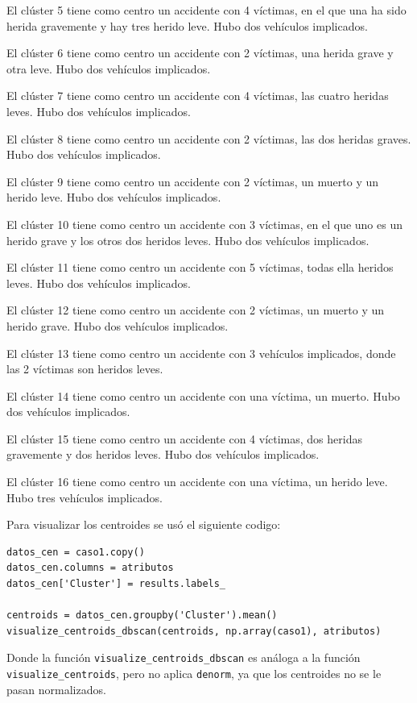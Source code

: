 \documentclass[a4]{article}
\begin{document}
El clúster 5 tiene como centro un accidente con 4 víctimas, en el que una ha sido herida gravemente y hay tres herido leve. Hubo dos vehículos implicados.

El clúster 6 tiene como centro un accidente con 2 víctimas, una herida grave  y otra leve. Hubo dos vehículos implicados.

El clúster 7 tiene como centro un accidente con 4 víctimas, las cuatro heridas leves. Hubo dos vehículos implicados.

El clúster 8 tiene como centro un accidente con 2 víctimas, las dos heridas graves. Hubo dos vehículos implicados.

El clúster 9 tiene como centro un accidente con 2 víctimas, un muerto y un herido leve. Hubo dos vehículos implicados.

El clúster 10 tiene como centro un accidente con 3 víctimas, en el que uno es un herido grave y los otros dos heridos leves. Hubo dos vehículos implicados.

El clúster 11 tiene como centro un accidente con 5 víctimas, todas ella heridos leves. Hubo dos vehículos implicados.

El clúster 12 tiene como centro un accidente con 2 víctimas, un muerto y un herido grave. Hubo dos vehículos implicados.

El clúster 13 tiene como centro un accidente con 3 vehículos implicados, donde las 2 víctimas son heridos leves.

El clúster 14 tiene como centro un accidente con una víctima, un muerto. Hubo dos vehículos implicados.

El clúster 15 tiene como centro un accidente con 4 víctimas, dos heridas gravemente y dos heridos leves. Hubo dos vehículos implicados.

El clúster 16 tiene como centro un accidente con una víctima, un herido leve. Hubo tres vehículos implicados.

Para visualizar los centroides se usó el siguiente codigo:

\begin{lstlisting}
datos_cen = caso1.copy()
datos_cen.columns = atributos
datos_cen['Cluster'] = results.labels_

centroids = datos_cen.groupby('Cluster').mean()
visualize_centroids_dbscan(centroids, np.array(caso1), atributos)
\end{lstlisting}

Donde la función \texttt{visualize\_centroids\_dbscan} es análoga a la función \texttt{visualize\_centroids}, pero no aplica \texttt{denorm}, ya que los centroides no se le pasan normalizados.
\end{document}
